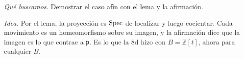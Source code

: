 \begin{center}
\end{center}

\emph{Qué buscamos.} Demostrar el caso afín con el lema y la afirmación.

\emph{Idea.} Por el lema, la proyección es \(\operatorname{Spec}\) de localizar y luego cocientar. Cada movimiento es un homeomorfismo sobre su imagen, y la afirmación dice que la imagen es lo que contrae a \(\mathfrak p\). Es lo que la 8d hizo con \(B=\mathbb Z[t]\), ahora para cualquier \(B\).

